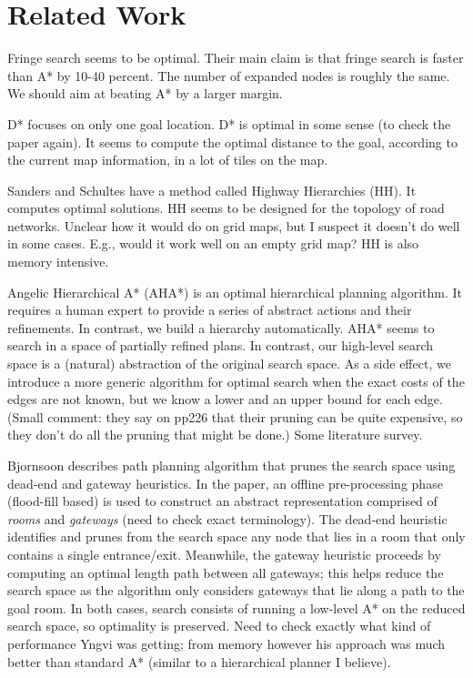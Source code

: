 \section{Related Work}
Fringe search seems to be optimal. Their main claim is that fringe search is faster than A* by 10-40 percent. The number of expanded nodes is roughly the same. We should aim at beating A* by a larger margin.
\par
D* focuses on only one goal location. D* is optimal in some sense (to check the paper again).
It seems to compute the optimal distance to the goal, according to the current map information,
in a lot of tiles on the map.
\par
Sanders and Schultes have a method called Highway Hierarchies (HH). It computes optimal solutions. 
HH seems to be designed for the topology of road networks. Unclear how it would do on grid maps, but I suspect it doesn't do well in some cases. E.g., would it work well on an empty grid map? HH is also memory intensive.
\par
Angelic Hierarchical A* (AHA*) is an optimal hierarchical planning algorithm.
It requires a human expert to provide a series of abstract actions and their refinements.
In contrast, we build a hierarchy automatically.
AHA* seems to search in a space of partially refined plans. 
In contrast, our high-level search space is a (natural) abstraction of the original search space.
As a side effect, we introduce a more generic algorithm for optimal search when the exact costs of the edges are not known, but we know a lower and an upper bound for each edge.
(Small comment: they say on pp226 that their pruning can be quite expensive, so they don't do all the pruning that might be done.)
Some literature survey.
\par
Bjornsoon describes path planning algorithm that prunes the search space using dead-end and gateway heuristics. 
In the paper, an offline pre-processing phase (flood-fill based) is used to construct an abstract representation comprised of \emph{rooms} and \emph{gateways} (need to check exact terminology). 
The dead-end heuristic identifies and prunes from the search space any node that lies in a room that only contains a single entrance/exit. 
Meanwhile, the gateway heuristic proceeds by computing an optimal length path between all gateways; this helps reduce the search space as the algorithm only considers gateways that lie along a path to the goal room.  
In both cases, search consists of running a low-level A* on the reduced search space, so optimality is preserved.
Need to check exactly what kind of performance Yngvi was getting; from memory however his approach was much better than standard A* (similar to a hierarchical planner I believe).

